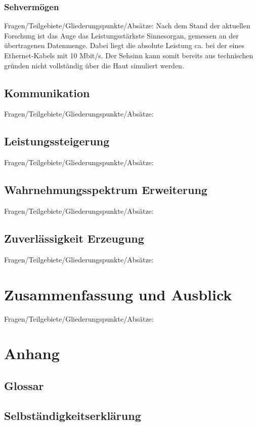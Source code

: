 \documentclass{llncs}					%
\begin{document}
\subsubsection{Sehvermögen}
Fragen/Teilgebiete/Gliederungspunkte/Absätze:
Nach dem Stand der aktuellen Forschung ist das Auge das Leistungsstärkste Sinnesorgan, gemessen an der übertragenen Datenmenge\cite{Koch2006}. Dabei liegt die absolute Leistung ca. bei der eines Ethernet-Kabels mit 10 Mbit/s\cite{Koch2006}. Der Sehsinn kann somit bereits aus technischen gründen nicht vollständig über die Haut simuliert werden.
\subsection{Kommunikation}
Fragen/Teilgebiete/Gliederungspunkte/Absätze:

\subsection{Leistungssteigerung}
Fragen/Teilgebiete/Gliederungspunkte/Absätze:

\subsection{Wahrnehmungsspektrum Erweiterung}
Fragen/Teilgebiete/Gliederungspunkte/Absätze:

\subsection{Zuverlässigkeit Erzeugung}
Fragen/Teilgebiete/Gliederungspunkte/Absätze:

\section{Zusammenfassung und Ausblick}
Fragen/Teilgebiete/Gliederungspunkte/Absätze:

\section{Anhang}

\clearpage
\subsection{Glossar}\label{glossar}

\renewcommand*{\glossarysection}[2][]{}	%
\printnoidxglossaries				%

\subsection{Selbständigkeitserklärung}

\clearpage

\end{document}
